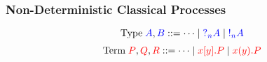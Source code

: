 \documentclass[xcolor={dvipsnames}]{beamer}
\begin{document}
\begin{frame}[label=nodcap]
  \frametitle{Non-Deterministic Classical Processes}
  \[
    \text{Type} \; \tm{A}, \tm{B} ::= \dots \mid \tm{\give[n]{A}} \mid \tm{\take[n]{A}}
  \]
  \[\!
    \begin{aligned}
      \text{Term} \; {\color{tm}P}, {\color{tm}Q}, {\color{tm}R} ::= \dots
      \mid {\color{tm}{\send{x}{y}P}}
      \mid {\color{tm}{\recv{x}{y}P}}
    \end{aligned}
  \]

  \begin{center}
    \begin{proofbox}[1]
      \SYM{\give[1]{}}
    \end{proofbox}
    \begin{proofbox}[1]
      \SYM{\take[1]{}}
    \end{proofbox}
  \end{center}

  \begin{proofblock}[1]
  \end{proofblock}
  \begin{proofblock}[1]
  \end{proofblock}
\end{frame}
\end{document}
